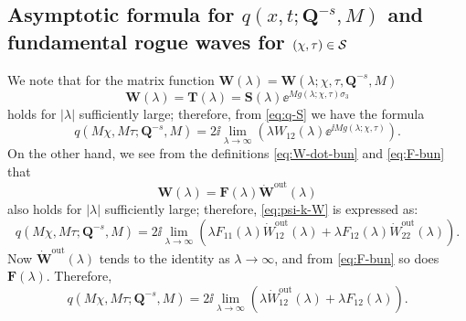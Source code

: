 \subsection{Asymptotic formula for $q(x,t;\mathbf{Q}^{-s},M)$ and fundamental rogue waves for $(\chi,\tau)\in \mathcal{S}$} We note that for the matrix function $\mathbf{W}(\lambda)=\mathbf{W}(\lambda;\chi,\tau,\mathbf{Q}^{-s},M)$
\begin{equation}
\mathbf{W} (\lambda)  = \mathbf{T} (\lambda) = \mathbf{S} (\lambda) \ee^{M g(\lambda;\chi,\tau)\sigma_3} 
\end{equation}
holds for $|\lambda|$ sufficiently large; therefore, from \eqref{eq:q-S} we have the formula
\begin{equation}
q(M\chi, M\tau; \mathbf{Q}^{-s}, M ) = 2\ii  \lim_{\lambda\to\infty} \left( \lambda W_{12}(\lambda) \ee^{\ii M g(\lambda;\chi,\tau)}\right).
\label{eq:psi-k-W}
\end{equation}
On the other hand, we see from the definitions \eqref{eq:W-dot-bun} and \eqref{eq:F-bun} that 
\begin{equation}
\mathbf{W}(\lambda) = \mathbf{F}(\lambda) \dot{\mathbf{W}}^{\mathrm{out}}(\lambda)
\end{equation}
also holds for $|\lambda|$ sufficiently large; therefore, \eqref{eq:psi-k-W} is expressed as:
\begin{equation}
q(M\chi, M\tau; \mathbf{Q}^{-s}, M ) = 2\ii  \lim_{\lambda\to\infty} \left( \lambda F_{11}(\lambda) \dot{W}^{\mathrm{out}}_{12}(\lambda) +  \lambda F_{12}(\lambda) \dot{W}^{\mathrm{out}}_{22}(\lambda) \right).
\label{eq:psi-k-F}
\end{equation}
Now $\dot{\mathbf{W}}^\mathrm{out}(\lambda)$ tends to the identity as $\lambda\to\infty$, and from \eqref{eq:F-bun} so does $\mathbf{F}(\lambda)$.  Therefore,
\begin{equation}
q(M\chi, M\tau; \mathbf{Q}^{-s}, M ) = 2\ii  \lim_{\lambda\to\infty} \left( \lambda  \dot{W}^{\mathrm{out}}_{12}(\lambda) +   \lambda F_{12}(\lambda) \right).
\label{eq:psi-k-F-simp}
\end{equation}

